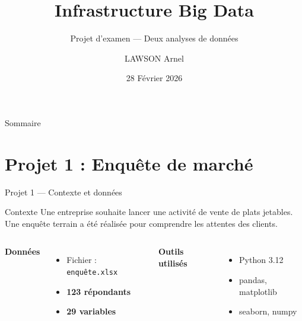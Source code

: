 \documentclass{beamer}
\title[Projet Big Data]{Infrastructure Big Data}
\subtitle{Projet d'examen --- Deux analyses de données}
\author{LAWSON Arnel}
\date{28 Février 2026}
\begin{document}
\begin{frame}
  \titlepage
\end{frame}

\begin{frame}{Sommaire}
  \tableofcontents
\end{frame}

\section{Projet 1 : Enquête de marché}

\begin{frame}{Projet 1 --- Contexte et données}
  \begin{block}{Contexte}
    Une entreprise souhaite lancer une activité de vente de plats jetables.
    Une enquête terrain a été réalisée pour comprendre les attentes des clients.
  \end{block}

  \begin{columns}
    \textbf{Données}
    \begin{itemize}
      \item Fichier : \texttt{enquête.xlsx}
      \item \textbf{123 répondants}
      \item \textbf{29 variables}
    \end{itemize}

    \textbf{Outils utilisés}
    \begin{itemize}
      \item Python 3.12
      \item pandas, matplotlib
      \item seaborn, numpy
    \end{itemize}
  \end{columns}
\end{frame}
\end{document}
